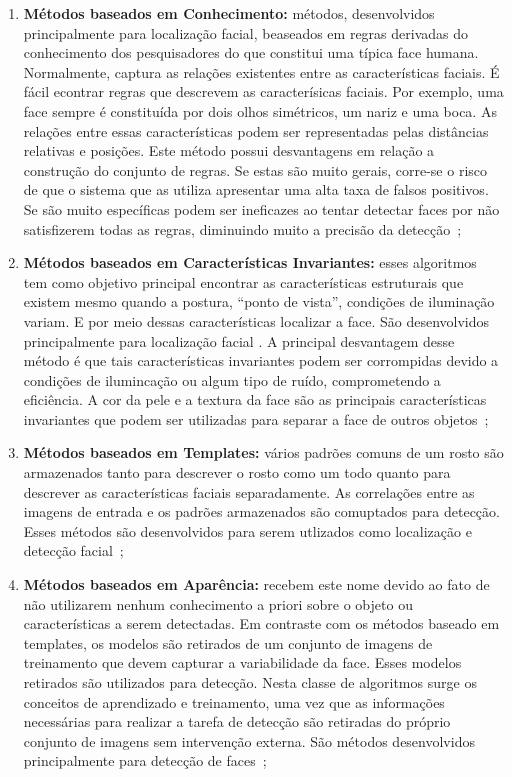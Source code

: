 	\begin{enumerate}
		\item \textbf{Métodos baseados em Conhecimento:} métodos, desenvolvidos principalmente para localização facial, beaseados em regras derivadas do conhecimento dos pesquisadores do que constitui uma típica face humana. Normalmente, captura as relações existentes entre as características faciais. É fácil econtrar regras que descrevem as caracterísicas faciais. Por exemplo, uma face sempre é constituída por dois olhos simétricos, um nariz e uma boca. As relações entre essas características podem ser representadas pelas distâncias relativas e posições. Este método possui desvantagens em relação a construção do conjunto de regras. Se estas são muito gerais, corre-se o risco de que o sistema que as utiliza apresentar uma alta taxa de falsos positivos. Se são muito específicas podem ser ineficazes ao tentar detectar faces por não satisfizerem todas as regras, diminuindo muito a precisão da detecção~\cite{yang,lopes};

		\item \textbf{Métodos baseados em Características Invariantes:} esses algoritmos tem como objetivo principal encontrar as características estruturais que existem mesmo quando a postura, ``ponto de vista'', condições de iluminação variam. E por meio dessas características localizar a face. São desenvolvidos principalmente para localização facial \cite{yang}. A principal desvantagem desse método é que tais características invariantes podem ser corrompidas devido a condições de ilumincação ou algum tipo de ruído, comprometendo a eficiência. A cor da pele e a textura da face são as principais características invariantes que podem ser utilizadas para separar a face de outros objetos~\cite{lopes};

		\item \textbf{Métodos baseados em Templates:} vários padrões comuns de um rosto são armazenados tanto para descrever o rosto como um todo quanto para descrever as características faciais separadamente. As correlações entre as imagens de entrada e os padrões armazenados são comuptados para detecção. Esses métodos são desenvolvidos para serem utlizados como localização e detecção facial~\cite{yang};

		\item \textbf{Métodos baseados em Aparência:} recebem este nome devido ao fato de não utilizarem nenhum conhecimento a priori sobre o objeto ou características a serem detectadas. Em contraste com os métodos baseado em templates, os modelos são retirados de um conjunto de imagens de treinamento que devem capturar a variabilidade da face. Esses modelos retirados são utilizados para detecção. Nesta classe de algoritmos surge os conceitos de aprendizado e treinamento, uma vez que as informações necessárias para realizar a tarefa de detecção são retiradas do próprio conjunto de imagens sem intervenção externa. São métodos desenvolvidos principalmente para detecção de faces~\cite{yang, lopes};

	\end{enumerate}
	
